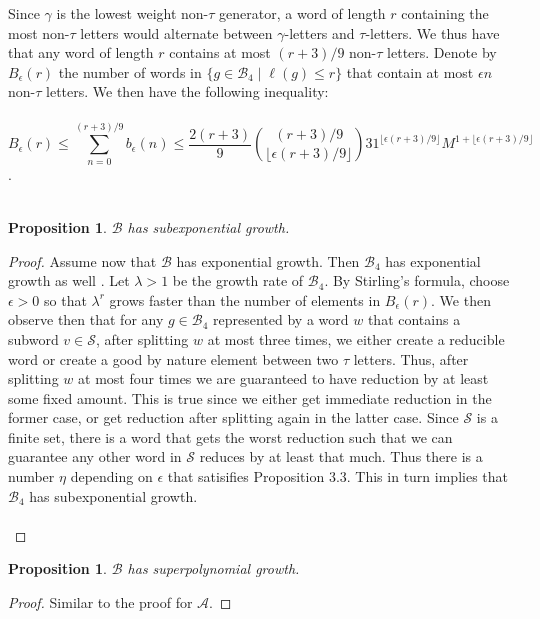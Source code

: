 \documentclass[11pt]{amsart}
\newtheorem{proposition}[theorem]{Proposition}
\theoremstyle{definition}
\theoremstyle{remark}
\numberwithin{equation}{section}
\begin{document}
Since $\gamma$ is the lowest weight non-$\tau$ generator, a word of length $r$ containing the most non-$\tau$ letters would alternate between $\gamma$-letters and $\tau$-letters. We thus have that any word of length $r$ contains at most $(r+3)/9$ non-$\tau$ letters. Denote by $ B_{\epsilon}(r)$ the number of words in $ \{g \in \mathcal{B}_4 \mid \ell(g) \leq r\} $ that contain at most $ \epsilon n $ non-$\tau$ letters. We then have the following inequality: \\ \\ $$ B_{\epsilon}(r) \leq \displaystyle{ \sum_{n=0}^{(r+3)/9} b_{\epsilon}(n) } \leq \displaystyle{  \frac{2(r+3)}{9} \displaystyle{ (r+3)/9 \choose \lfloor \epsilon (r+3)/9 \rfloor } 31^{ \lfloor \epsilon (r+3)/9 \rfloor } M^{1 + \lfloor \epsilon (r+3)/9 \rfloor} } $$. \\ \\
\begin{proposition}
$\mathcal{B}$ has subexponential growth.
\end{proposition}
\begin{proof}
Assume now that $\mathcal{B}$ has exponential growth. Then $\mathcal{B}_4$ has exponential growth as well \cite{BuxP}. Let $ \lambda > 1 $ be the growth rate of $\mathcal{B}_4$. By Stirling's formula, choose $\epsilon > 0$ so that $\lambda^{r}$ grows faster than the number of elements in $B_{\epsilon}(r)$.
We then observe then that for any $g \in \mathcal{B}_4$ represented by a word $w$ that contains a subword $v \in \mathcal{S}$, after splitting $w$ at most three times, we either create a reducible word or create a good by nature element between two $\tau$ letters. Thus, after splitting $w$ at most four times we are guaranteed to have reduction by at least some fixed amount. This is true since we either get immediate reduction in the former case, or get reduction after splitting again in the latter case. Since $\mathcal{S}$ is a finite set, there is a word that gets the worst reduction such that we can guarantee any other word in $\mathcal{S}$ reduces by at least that much.  Thus there is a number $\eta$ depending on $\epsilon$ that satisifies Proposition 3.3. This in turn implies that $\mathcal{B}_4$ has subexponential growth. \\ \\
\end{proof} 
\begin{proposition}
$\mathcal{B}$ has superpolynomial growth.
\end{proposition}
\begin{proof}
Similar to the proof for $\mathcal{A}$.
\end{proof}
 
\end{document}
